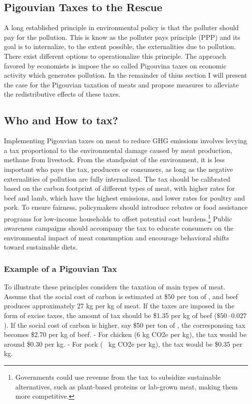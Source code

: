 \documentclass{article}[12pt,letterpaper]
\begin{document}
\subsection{Pigouvian Taxes to the Rescue}
A long established principle in environmental policy is that the polluter should pay for the pollution. This is know as the polluter pays principle (PPP) and its goal is to internalize, to the extent possible, the externalities due to pollution. There exist different options to operationalize this principle. The approach favored by economists is impose the so called Pigouvina taxes on economic activity which generates pollution. In the remainder of thius section I will present the case for the Pigouvian taxation of meats and propose measures to alleviate the redistributive effects of these taxes. 

\subsection{Who and How to tax?}
Implementing Pigouvian taxes on meat to reduce GHG emissions involves levying a tax proportional to the environmental damage caused by meat production, methane from livestock. From the standpoint of the environment, it is less important who pays the tax, producers or consumers, as long as the negative externalities of pollution are fully internalized. The tax should be calibrated based on the carbon footprint of different types of meat, with higher rates for beef and lamb, which have the highest emissions, and lower rates for poultry and pork. To ensure fairness, policymakers should introduce rebates or food assistance programs for low-income households to offset potential cost burdens.\footnote{Governments could use revenue from the tax to subsidize sustainable alternatives, such as plant-based proteins or lab-grown meat, making them more competitive.} Public awareness campaigns should accompany the tax to educate consumers on the environmental impact of meat consumption and encourage behavioral shifts toward sustainable diets.

\subsubsection{Example of a Pigouvian Tax}
To illustrate these principles considers the taxation of main types of meat. Assume that the social cost of carbon is estimated at \$50 per ton of \cadi, and beef produces approximately 27 kg \cadi per kg of meat. If the taxes are imposed in the form of excise taxes, the amount of tax should be \$1.35 per kg of beef ($\$50 \cdot 0.027$). If the social cost of carbon is higher, say \$50 per ton of \cadi, the corresponsing tax becomes \$2.70 per kg of beef. 
- For chicken (6 kg CO2e per kg), the tax would be around \$0.30 per kg.  
- For pork (~ kg CO2e per kg), the tax would be \$0.35 per kg.  
\end{document}

